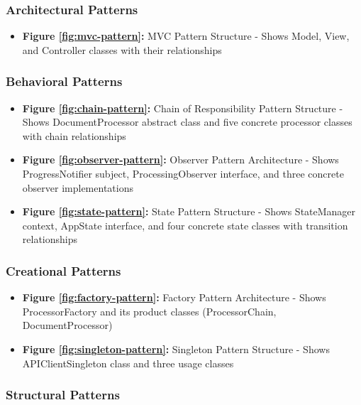\documentclass[11pt, a4paper]{article}
\theoremstyle{plain}
\theoremstyle{definition}
\begin{document}
\subsubsection{Architectural Patterns}

\begin{itemize}
    \item \textbf{Figure \ref{fig:mvc-pattern}:} MVC Pattern Structure - Shows Model, View, and Controller classes with their relationships
\end{itemize}

\subsubsection{Behavioral Patterns}

\begin{itemize}
    \item \textbf{Figure \ref{fig:chain-pattern}:} Chain of Responsibility Pattern Structure - Shows DocumentProcessor abstract class and five concrete processor classes with chain relationships
    
    \item \textbf{Figure \ref{fig:observer-pattern}:} Observer Pattern Architecture - Shows ProgressNotifier subject, ProcessingObserver interface, and three concrete observer implementations
    
    \item \textbf{Figure \ref{fig:state-pattern}:} State Pattern Structure - Shows StateManager context, AppState interface, and four concrete state classes with transition relationships
\end{itemize}

\subsubsection{Creational Patterns}

\begin{itemize}
    \item \textbf{Figure \ref{fig:factory-pattern}:} Factory Pattern Architecture - Shows ProcessorFactory and its product classes (ProcessorChain, DocumentProcessor)
    
    \item \textbf{Figure \ref{fig:singleton-pattern}:} Singleton Pattern Structure - Shows APIClientSingleton class and three usage classes
\end{itemize}

\subsubsection{Structural Patterns}
\end{document}
